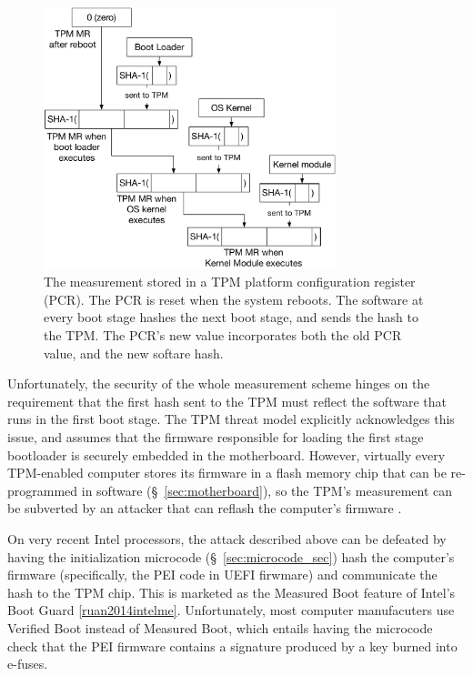 \begin{figure}[hbt]
  \centering
  \includegraphics[width=85mm]{figures/tpm_measurement.pdf}
  \caption{
    The measurement stored in a TPM platform configuration register (PCR). The
    PCR is reset when the system reboots. The software at every boot stage
    hashes the next boot stage, and sends the hash to the TPM. The PCR's new
    value incorporates both the old PCR value, and the new softare hash.
  }
  \label{fig:tpm_measurement}
\end{figure}

Unfortunately, the security of the whole measurement scheme hinges on the
requirement that the first hash sent to the TPM must reflect the software that
runs in the first boot stage. The TPM threat model explicitly acknowledges this
issue, and assumes that the firmware responsible for loading the first stage
bootloader is securely embedded in the motherboard. However, virtually every
TPM-enabled computer stores its firmware in a flash memory chip that can be
re-programmed in software (\S~\ref{sec:motherboard}), so the TPM's measurement
can be subverted by an attacker that can reflash the computer's firmware
\cite{butterworth2013bios}.

On very recent Intel processors, the attack described above can be defeated by
having the initialization microcode (\S~\ref{sec:microcode_sec}) hash the
computer's firmware (specifically, the PEI code in UEFI \cite{forum2015uefi}
firwmare) and communicate the hash to the TPM chip. This is marketed as the
Measured Boot feature of Intel's Boot Guard \ref{ruan2014intelme}.
Unfortunately, most computer manufacuters use Verified Boot instead of Measured
Boot, which entails having the microcode check that the PEI firmware contains a
signature produced by a key burned into e-fuses.


